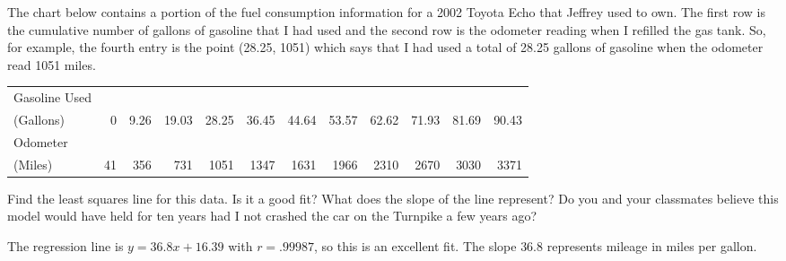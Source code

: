 \documentclass{ximera}
\begin{document}
\begin{problem}
The chart below contains a portion of the fuel consumption information for a 2002 Toyota Echo that Jeffrey used to own.  The first row is the cumulative number of gallons of gasoline that I had used and the second row is the odometer reading when I refilled the gas tank.  So, for example, the fourth entry is the point (28.25, 1051) which says that I had used a total of 28.25 gallons of gasoline when the odometer read 1051 miles.

\begin{tabular}{|l|r|r|r|r|r|r|r|r|r|r|r|} \hline
Gasoline Used & & & & & & & & & & & \\
(Gallons)  & 0 & 9.26 & 19.03 & 28.25 & 36.45 & 44.64 & 53.57 & 62.62 & 71.93 & 81.69 & 90.43\\
\hline
Odometer & & & & & & & & & & & \\
(Miles) & 41 & 356 & 731 & 1051 & 1347 & 1631 & 1966 & 2310 & 2670 & 3030 & 3371\\ \hline
\end{tabular}

Find the least squares line for this data.  Is it a good fit?  What does the slope of the line represent?  Do you and your classmates believe this model would have held for ten years had I not crashed the car on the Turnpike a few years ago?

\begin{solution}
The regression line is $y = 36.8x + 16.39$ with  $r = .99987$, so this is an excellent fit.  The slope $36.8$ represents mileage in miles per gallon.
\end{solution}
\end{problem}
\end{document}
